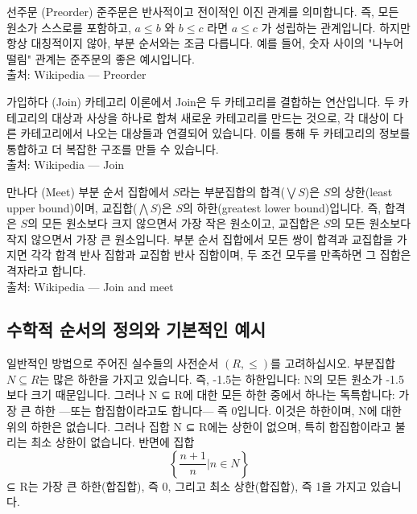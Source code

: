 \documentclass[11pt, a4paper, twoside, openany]{book}
\begin{document}
\begin{deepresearch}{선주문 (Preorder)}
준주문은 반사적이고 전이적인 이진 관계를 의미합니다.  즉, 모든 원소가 스스로를 포함하고, $a \le b$ 와 $b \le c$ 라면 $a \le c$ 가 성립하는 관계입니다. 하지만 항상 대칭적이지 않아, 부분 순서와는 조금 다릅니다. 예를 들어, 숫자 사이의 "나누어떨림" 관계는 준주문의 좋은 예시입니다.
\\[4pt]{\footnotesize\color{ctgray} 출처: Wikipedia — Preorder}
\end{deepresearch}

\begin{deepresearch}{가입하다 (Join)}
카테고리 이론에서 Join\hspace{0pt}은 두 카테고리를 결합하는 연산입니다.  두 카테고리의 대상과 사상을 하나로 합쳐 새로운 카테고리를 만드는 것으로, 각 대상이 다른 카테고리에서 나오는 대상들과 연결되어 있습니다. 이를 통해 두 카테고리의 정보를 통합하고 더 복잡한 구조를 만들 수 있습니다.
\\[4pt]{\footnotesize\color{ctgray} 출처: Wikipedia — Join}
\end{deepresearch}

\begin{deepresearch}{만나다 (Meet)}
부분 순서 집합에서 $S$라는 부분집합의 합격($\bigvee S$)은 $S$의 상한(least upper bound)이며, 교집합($\bigwedge S$)은 $S$의 하한(greatest lower bound)입니다.  즉, 합격은 $S$의 모든 원소보다 크지 않으면서 가장 작은 원소이고, 교집합은 $S$의 모든 원소보다 작지 않으면서 가장 큰 원소입니다. 부분 순서 집합에서 모든 쌍이 합격과 교집합을 가지면 각각 합격 반사 집합과 교집합 반사 집합이며, 두 조건 모두를 만족하면 그 집합은 격자라고 합니다.
\\[4pt]{\footnotesize\color{ctgray} 출처: Wikipedia — Join and meet}
\end{deepresearch}


\subsection{수학적 순서의 정의와 기본적인 예시}
\label{sec:1-3-1}

일반적인 방법으로 주어진 실수들의 사전순서 $(R, \le)$를 고려하십시오. 부분집합 $N \subseteq R$는 많은 하한을 가지고 있습니다. 즉, -1.5\hspace{0pt}는 하한입니다: N\hspace{0pt}의 모든 원소가 -1.5\hspace{0pt}보다 크기 때문입니다. 그러나 N ⊆ R\hspace{0pt}에 대한 모든 하한 중에서 하나는 독특합니다: 가장 큰 하한 —또는 합집합이라고도 합니다— 즉 0\hspace{0pt}입니다. 이것은 하한이며, N\hspace{0pt}에 대한 위의 하한은 없습니다. 그러나 집합 N ⊆ R\hspace{0pt}에는 상한이 없으며, 특히 합집합이라고 불리는 최소 상한이 없습니다. 반면에 집합
$$
\left\{ \frac{n + 1}{n} | n \in N \right\}
$$
⊆ R\hspace{0pt}는 가장 큰 하한(합집합), 즉 0, 그리고 최소 상한(합집합), 즉 1\hspace{0pt}을 가지고 있습니다.
\end{document}
